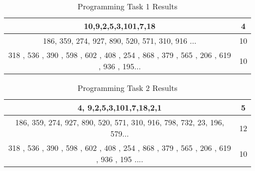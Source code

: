 \documentclass{article}
\begin{document}
\maketitle
\begin{table}
    \centering
\caption{Programming Task 1 Results}
\label{tab:my_label}
    \begin{tabular}{|c|c|} \hline 
          10,9,2,5,3,101,7,18& 4\\ \hline 
         186, 359, 274, 927, 890, 520, 571, 310, 916 ...& 10\\ \hline
 318 , 536 , 390 , 598 , 602 , 408 , 254 , 868 , 379 , 565 , 206 , 619 , 936 , 195...&10\\\hline
    \end{tabular}
    
    
\end{table}



\begin{table}
    \centering
\caption{Programming Task 2 Results}
\label{tab:my_label}
    \begin{tabular}{|c|c|} \hline 
         4, 9,2,5,3,101,7,18,2,1& 5\\ \hline 
         186, 359, 274, 927, 890, 520, 571, 310, 916, 798, 732, 23, 196, 579...& 12\\ \hline 
         318 , 536 , 390 , 598 , 602 , 408 , 254 , 868 , 379 , 565 , 206 , 619 , 936 , 195 ....& 10\\ \hline
    \end{tabular}
    
    
\end{table}
\end{document}
